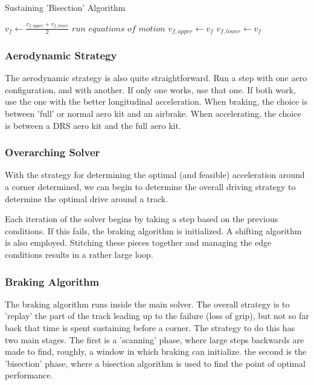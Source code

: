 \documentclass{article}
\begin{document}
\begin{algorithm}[H]
\caption{Sustaining 'Bisection' Algorithm}
\begin{algorithmic}[1]
		\State $v_f \gets \frac{v_{f,upper}+v_{f,lower}}{2}$
		\State $run$ $equations$ $of$ $motion$
			\State $v_{f,upper} \gets v_{f}$
		\Else
			\State $v_{f,lower} \gets v_{f}$
		\EndIf
	\EndWhile
\end{algorithmic}
\end{algorithm}

\subsubsection{Aerodynamic Strategy}

The aerodynamic strategy is also quite straightforward. Run a step with one aero configuration, and with another. If only one works, use that one. If both work, use the one with the better longitudinal acceleration. When braking, the choice is between 'full' or normal aero kit and an airbrake. When accelerating, the choice is between a DRS aero kit and the full aero kit.

\subsubsection{Overarching Solver}

With the strategy for determining the optimal (and feasible) acceleration around a corner determined, we can begin to determine the overall driving strategy to determine the optimal drive around a track.

Each iteration of the solver begins by taking a step based on the previous conditions. If this fails, the braking algorithm is initialized. A shifting algorithm is also employed. Stitching these pieces together and managing the edge conditions results in a rather large loop.

\subsubsection{Braking Algorithm}
The braking algorithm runs inside the main solver. The overall strategy is to 'replay' the part of the track leading up to the failure (loss of grip), but not so far back that time is spent sustaining before a corner. The strategy to do this has two main stages. The first is a 'scanning' phase, where large steps backwards are made to find, roughly, a window in which braking can initialize. the second is the 'bisection' phase, where a bisection algorithm is used to find the point of optimal performance.
\end{document}

